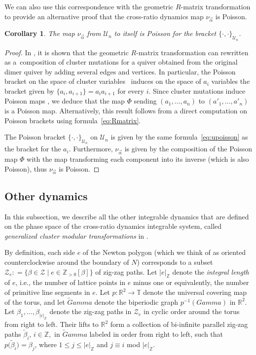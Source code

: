 \documentclass[10pt,a4paper]{amsart}
\numberwithin{equation}{section}
\newtheorem{Corollary}[Theorem]{Corollary}
\newcommand{\Z}{{\mathbb Z}}
\newcommand{\R}{{\mathbb R}}
\newcommand{\T}{{\mathbb T}}
\newcommand{\ra}{\rightarrow}
\def\Gamma{Gamma}
\begin{document}
	We can also use this correspondence with the geometric $R$-matrix transformation to provide an alternative proof that the cross-ratio dynamics map $\nu_{\vec\alpha}$ is Poisson.
	
	\begin{Corollary}
		The map $\nu_{\vec\alpha}$ from $\mathcal U_n$ to itself is Poisson for the bracket $\{\cdot,\cdot\}_{\mathcal U_n}$.
	\end{Corollary}
	
\begin{proof}In \cite{ILP2}, it is shown that the geometric $R$-matrix transformation can rewritten as a~composition of cluster mutations for a quiver obtained from the original dimer quiver by adding several edges and vertices. In particular, the Poisson bracket on the space of cluster variables~\cite{GSV1} induces on the space of $a_i$ variables the bracket given by $\{a_i,a_{i+1}\}=a_ia_{i+1}$ for every $i$. Since cluster mutations induce Poisson maps \cite{GSV1}, we deduce that the map $\Phi$ sending $(a_1,\dots,a_n)$ to $(a'_1,\dots,a'_n)$ is a Poisson map. Alternatively, this result follows from a direct computation on Poisson brackets using formula~\eqref{eq:Rmatrix}.
		
		The Poisson bracket $\{\cdot,\cdot\}_{\mathcal U_n}$ on $\mathcal U_n$ is given by the same formula~\eqref{eq:upoisson} as the bracket for the $a_i$. Furthermore, $\nu_{\vec\alpha}$ is given by the composition of the Poisson map $\Phi$ with the map transforming each component into its inverse (which is also Poisson), thus $\nu_{\vec\alpha}$ is Poisson.
	\end{proof}
	
\subsection{Other dynamics}\label{subsec:otherdynamics}
	In this subsection, we describe all the other integrable dynamics that are defined on the phase space of the cross-ratio dynamics integrable system, called \textit{generalized cluster modular transformations} in \cite{GeRa}.
	
By definition, each side $e$ of the Newton polygon (which we think of as oriented counterclockwise around the boundary of $N$) corresponds to a subset $\mathcal Z_e : = \{ \beta \in \mathcal Z\mid e \in \Z_{>0}[\beta]\}$ of zig-zag paths. Let $|e|_\Z$ denote the \textit{integral length} of $e$, i.e., the number of lattice points in $e$ minus one or equivalently, the number of primitive line segments in $e$. Let $p\colon \R^2 \ra \T$ denote the universal covering map of the torus, and let $\widetilde \Gamma$ denote the biperiodic graph $p^{-1}(\Gamma)$ in $\R^2$. Let $\beta_1,\dots,\beta_{|e|_{\Z}}$ denote the zig-zag paths in $\mathcal Z_e$ in cyclic order around the torus from right to left. Their lifts to $\R^2$ form a collection of bi-infinite parallel zig-zag paths $\widetilde \beta_i$, $i\in \Z,$ in $\widetilde \Gamma$ labeled in order from right to left, such that $p\big(\widetilde \beta_i\big)=\beta_{j}$, where $1\leq j\leq |e|_\Z$ and $j \equiv i $ mod $|e|_\Z$.
	
\end{document}
